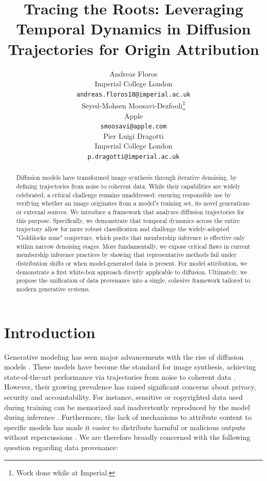 \documentclass{article}
\title{Tracing the Roots: Leveraging Temporal Dynamics in Diffusion Trajectories for Origin Attribution}
\author{%
  Andreas Floros \\
  Imperial College London \\
  \texttt{andreas.floros18@imperial.ac.uk} \\
  \AND
  Seyed-Mohsen Moosavi-Dezfooli\thanks{Work done while at Imperial.} \\
  Apple \\
  \texttt{smoosavi@apple.com} \\
  \And
  Pier Luigi Dragotti \\
  Imperial College London \\
  \texttt{p.dragotti@imperial.ac.uk} \\
}
\theoremstyle{remark}
\begin{document}
\maketitle

\setcounter{footnote}{0}

\begin{abstract}
    Diffusion models have transformed image synthesis through iterative denoising, by defining trajectories from noise to coherent data. While their capabilities are widely celebrated, a critical challenge remains unaddressed: ensuring responsible use by verifying whether an image originates from a model's training set, its novel generations or external sources. We introduce a framework that analyzes diffusion trajectories for this purpose. Specifically, we demonstrate that temporal dynamics across the entire trajectory allow for more robust classification and challenge the widely-adopted "Goldilocks zone" conjecture, which posits that membership inference is effective only within narrow denoising stages. More fundamentally, we expose critical flaws in current membership inference practices by showing that representative methods fail under distribution shifts or when model-generated data is present. For model attribution, we demonstrate a first white-box approach directly applicable to diffusion. Ultimately, we propose the unification of data provenance into a single, cohesive framework tailored to modern generative systems.
\end{abstract}


\section{Introduction}

Generative modeling has seen major advancements with the rise of diffusion models \citep{NEURIPS2020_4c5bcfec}. These models have become the standard for image synthesis, achieving state-of-the-art performance via trajectories from noise to coherent data \citep{Karras2024edm2}. However, their growing prevalence has raised significant concerns about privacy, security and accountability. For instance, sensitive or copyrighted data used during training can be memorized and inadvertently reproduced by the model during inference \citep{10.5555/3620237.3620531, 10203298, gu2025on}. Furthermore, the lack of mechanisms to attribute content to specific models has made it easier to distribute harmful or malicious outputs without repercussions \citep{wang2023where, pmlr-v235-laszkiewicz24a, 10.1007/978-3-031-73033-7_16}. We are therefore broadly concerned with the following question regarding data provenance:
\end{document}

